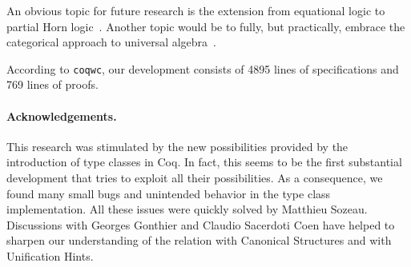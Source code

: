 \documentclass[a4paper,10pt,runningheads]{llncs}
\begin{document}
An obvious topic for future research is the extension from equational logic to partial Horn
logic~\cite{palmgren2007partial}. Another topic would be to fully, but practically, embrace the
categorical approach to universal algebra~\cite{pitts2001categorical}.

According to \lstinline|coqwc|, our development consists of 4895 lines of
specifications and 769 lines of proofs.


% 

\paragraph{Acknowledgements.}
This research was stimulated by the new possibilities provided by the introduction of type classes
in Coq. In fact, this seems to be the first substantial development that tries to exploit all their
possibilities. As a consequence, we found many small bugs and unintended behavior in the type
class implementation. All these issues were quickly solved by Matthieu Sozeau. Discussions with
Georges Gonthier and Claudio Sacerdoti Coen have helped to
sharpen our understanding of the relation with Canonical Structures and with Unification Hints.


\end{document}
